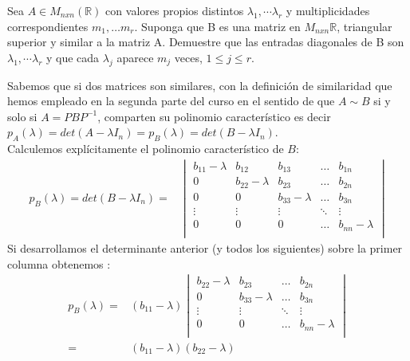 \documentclass[letter]{memoir} %
\newenvironment{cframed}[1][blue]
  {\begin{tcolorbox}[colframe=#1,colback=white]}
  {\end{tcolorbox}}
\begin{document}
\begin{enumerate}
\begin{cframed}[teal]
\item 
Sea $A \in M_{nxn}(\mathbb{R})$ con valores propios distintos $\lambda_1, \cdots \lambda_r$ y multiplicidades correspondientes $m_1, \dots m_r$. Suponga que B es una matriz en $M_{nxn}\mathbb{R}$, triangular superior y similar a la matriz A. Demuestre que las entradas diagonales de B son  $\lambda_1, \cdots \lambda_r$ y que cada $\lambda_j$ aparece $m_j$ veces, $1 \leq j \leq r $.

\end{cframed}
Sabemos que si dos matrices son similares, con la definición de similaridad que hemos empleado en la segunda parte del curso en el sentido de que $A\sim B$ si y solo si $A=PBP^{-1}$, comparten su polinomio característico es decir $p_A(\lambda) = det (A- \lambda I_n) = p_B(\lambda) = det(B-\lambda I_n)$.\\
Calculemos explícitamente el polinomio característico de $B$:\\
\[
\begin{split}
p_B(\lambda) = det(B-\lambda I _n) = &\begin{vmatrix}
				b_{11} - \lambda & b_{12} & b_{13} & \dots & b_{1n} \\
                0 & 			b_{22} -\lambda & b_{23} & \dots & b_{2n} \\
            	0 & 0 & b_{33}- \lambda &  \dots & b_{3n}\\
                \vdots & \vdots & \vdots & \ddots & \vdots \\
                0 & 0 & 0& \dots & b_{nn}- \lambda \\
				\end{vmatrix}
\end{split}
\]
Si desarrollamos el determinante anterior (y todos los siguientes) sobre la primer columna obtenemos :\\
\[
\begin{split}
p_B(\lambda) = & (b_{11} - \lambda )\begin{vmatrix}
						b_{22} -\lambda & b_{23} & \dots & b_{2n} \\
            			0 & b_{33}- \lambda &  \dots & b_{3n}\\
                 		\vdots & \vdots & \ddots & \vdots \\
                 		0 & 0& \dots & b_{nn}- \lambda \\
								\end{vmatrix} \\=& (b_{11} - \lambda ) (b_{22} - \lambda) 

\end{split}\]
\end{enumerate}
\end{document}
